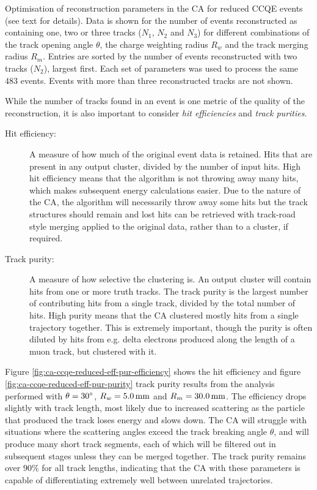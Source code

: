 \begin{table}
\caption[Optimisation of Cellular Automaton reconstruction parameters]{\label{table:ccqe-2tr-opt-results}Optimisation of reconstruction parameters in the \ac{CA} for reduced CCQE events (see text for details). Data is shown for the number of events reconstructed as containing one, two or three tracks ($N_1$, $N_2$ and $N_3$) for different combinations of the track opening angle $\theta$, the charge weighting radius $R_w$ and the track merging radius $R_m$. Entries are sorted by the number of events reconstructed with two tracks ($N_2$), largest first. Each set of parameters was used to process the same 483 events. Events with more than three reconstructed tracks are not shown.}
\end{table}

While the number of tracks found in an event is one metric of the quality of the reconstruction, it is also important to consider \emph{hit efficiencies} and \emph{track purities}.
\begin{description}
    \item[Hit efficiency:] A measure of how much of the original event data is retained. Hits that are present in any output cluster, divided by the number of input hits. High hit efficiency means that the algorithm is not throwing away many hits, which makes subsequent energy calculations easier. Due to the nature of the \ac{CA}, the algorithm will necessarily throw away some hits but the track structures should remain and lost hits can be retrieved with track-road style merging applied to the original data, rather than to a cluster, if required.
    \item[Track purity:] A measure of how selective the clustering is. An output cluster will contain hits from one or more truth tracks. The track purity is the largest number of contributing hits from a single track, divided by the total number of hits. High purity means that the \ac{CA} clustered mostly hits from a single trajectory together. This is extremely important, though the purity is often diluted by hits from e.g. delta electrons produced along the length of a muon track, but clustered with it.
\end{description}

Figure \ref{fig:ca-ccqe-reduced-eff-pur-efficiency} shows the hit efficiency and figure \ref{fig:ca-ccqe-reduced-eff-pur-purity} track purity results from the analysis performed with $\theta=30^\circ$, $R_w=5.0\,\mathrm{mm}$ and $R_m=30.0\,\mathrm{mm}$. The efficiency drops slightly with track length, most likely due to increased scattering as the particle that produced the track loses energy and slows down. The \ac{CA} will struggle with situations where the scattering angles exceed the track breaking angle $\theta$, and will produce many short track segments, each of which will be filtered out in subsequent stages unless they can be merged together. The track purity remains over $90\%$ for all track lengths, indicating that the \ac{CA} with these parameters is capable of differentiating extremely well between unrelated trajectories.

